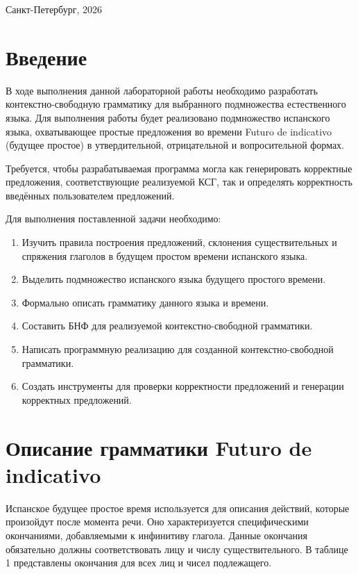 \documentclass[a4paper,final]{article}
\begin{document}
\hfill \break
\begin{center} \small{Санкт-Петербург, 2026} \end{center}


\newpage
\tableofcontents
\newpage

\section*{Введение}

В ходе выполнения данной лабораторной работы необходимо разработать контекстно-свободную грамматику для выбранного подмножества естественного языка. Для выполнения работы будет реализовано подмножество испанского языка, охватывающее простые предложения во времени Futuro de indicativo (будущее простое) в утвердительной, отрицательной и вопросительной формах.

Требуется, чтобы разрабатываемая программа могла как генерировать корректные предложения, соответствующие реализуемой КСГ, так и определять корректность введённых пользователем предложений.

Для выполнения поставленной задачи необходимо:
\begin{enumerate}
    \item Изучить правила построения предложений, склонения существительных и спряжения глаголов в будущем простом времени испанского языка.
    \item Выделить подмножество испанского языка будущего простого времени.
    \item Формально описать грамматику данного языка и времени.
    \item Составить БНФ для реализуемой контекстно-свободной грамматики.
    \item Написать программную реализацию для созданной контекстно-свободной грамматики.
    \item Создать инструменты для проверки корректности предложений и генерации корректных предложений.
\end{enumerate}

\newpage
\section{Описание грамматики Futuro de indicativo}


Испанское будущее простое время используется для описания действий, которые произойдут после момента речи. Оно характеризуется специфическими окончаниями, добавляемыми к инфинитиву глагола. Данные окончания обязательно должны соответствовать лицу и числу существительного. В таблице 1 представлены окончания для всех лиц и чисел подлежащего.
\end{document}
